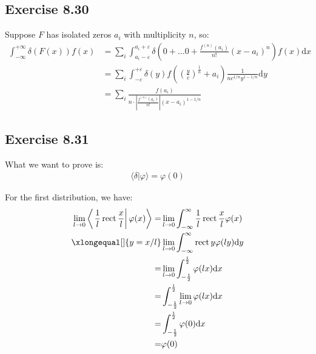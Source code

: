 \documentclass[]{ctexart}
\newcommand{\di}{\mathrm{d}}
\begin{document}
\subsection{Exercise 8.30}
Suppose $F$ has isolated zeros $a_i$ with multiplicity $n$, so:
\begin{equation*}
\begin{aligned}
\int_{-\infty}^{+\infty} \delta(F(x)) f(x)&=\sum_{i} \int_{a_{i}-\varepsilon}^{a_{i}+\varepsilon} \delta\left(0+\ldots 0+\frac{f^{(n)}\left(a_{i}\right)}{n !}\left(x-a_{i}\right)^{n}\right) f(x) \di x \\
&=\sum_{i} \int_{-\varepsilon}^{+\varepsilon} \delta(y) f\left(\left(\frac{y}{c}\right)^{\frac{1}{n}}+a_{i}\right) \frac{1}{n c^{1/n} y^{1-1/n}} \di y \\
&=\sum_{i} \frac{f\left(a_{i}\right)}{n \cdot\left|\frac{f^{(n)}(a_i) }{n !}\right|\left(x-a_{i}\right)^{1-1/n} }
\end{aligned}
\end{equation*}

\subsection{Exercise 8.31}
	What we want to prove is:
		\begin{equation*}
		\begin{aligned}
			\langle \delta |\varphi\rangle=\varphi(0)
		\end{aligned}
		\end{equation*}
		
	For the first distribution, we have:
		\begin{equation*}
		\begin{aligned}
			\lim _{l \rightarrow 0}\left\langle\left.\frac{1}{l} \operatorname{rect} \frac{x}{l}\right|\varphi(x)\right\rangle=&\lim_{l\to 0}\int_{-\infty}^{\infty}\frac{1}{l}\operatorname{rect}\frac{x}{l}\varphi(x)\\
			\xlongequal[]{y=x/l}&\lim_{l\to 0}\int_{-\infty}^{\infty}\operatorname{rect}y\varphi(ly)\di y\\
			=&\lim_{l\to 0}\int_{-\frac{1}{2}}^{\frac{1}{2}}\varphi(lx)\di x\\
			=&\int_{-\frac{1}{2}}^{\frac{1}{2}}\lim_{l\to 0}\varphi(lx)\di x\\
			=&\int_{-\frac{1}{2}}^{\frac{1}{2}}\varphi(0)\di x\\
			=&\varphi(0)
		\end{aligned}
		\end{equation*}
		
\end{document}
